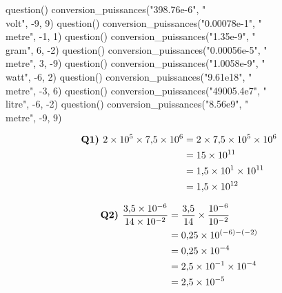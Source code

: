 \documentclass[../Cours.tex]{subfiles}
\begin{document}
\begin{questions}
    \begin{luacode}
        question() conversion_puissances("398.76e-6", "\\volt", -9, 9)
        question() conversion_puissances("0.00078e-1", "\\metre", -1, 1)
        question() conversion_puissances("1.35e-9", "\\gram", 6, -2)
        question() conversion_puissances("0.00056e-5", "\\metre", 3, -9)
        question() conversion_puissances("1.0058e-9", "\\watt", -6, 2)
        question() conversion_puissances("9.61e18", "\\metre", -3, 6)
        question() conversion_puissances("49005.4e7", "\\litre", -6, -2)
        question() conversion_puissances("8.56e9", "\\metre", -9, 9) 
    \end{luacode}

        \noindent\begin{minipage}{0.5\linewidth}
        \begin{align*}
            \mbox{\textbf{Q1)~}} \num{2e5} \times \num{7.5e6} &= \num{2} \times \num{7.5} \times 10^5 \times 10^6 \\
            &= 15 \times 10^{11} \\
            &= \num{1.5e1} \times 10^{11} \\
            &= \num{1.5e12}
        \end{align*}
        \end{minipage}
        \begin{minipage}{0.5\linewidth}
        \begin{align*}
            \mbox{\textbf{Q2)~}} \dfrac{\num{3.5e-6}}{\num{14e-2}} &= \dfrac{\num{3.5}}{14} \times \dfrac{10^{-6}}{10^{-2}} \\
            &= \num{0.25} \times 10^{(-6)-(-2)} \\
            &= \num{0.25} \times 10^{-4} \\ 
            &= \num{2.5e-1} \times 10^{-4} \\
            &= \num{2.5e-5}
        \end{align*}
        \end{minipage}


\end{questions}
\end{document}
